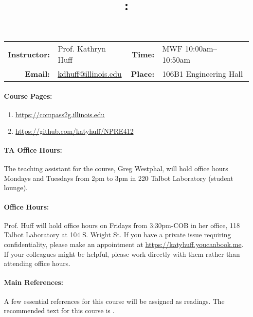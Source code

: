\documentclass[11pt, a4paper]{article}
\title{\CourseNumber: \CourseTitle\\}
\author{\CourseUniversity}
\date{\CourseSemester \CourseYear}
\makeatletter
\newcommand{\CourseNumber}{NPRE412}
\newcommand{\CourseInstructor}{Prof. Kathryn Huff\xspace}%
\newcommand{\CourseDays}{MWF\xspace}%
\newcommand{\CourseStart}{10:00am\xspace}%
\newcommand{\CourseEnd}{10:50am\xspace}%
\newcommand{\CourseInstructorEmail}{kdhuff@illinois.edu}
\newcommand{\CourseRoom}{106B1\xspace}%
\newcommand{\CourseBuilding}{Engineering Hall\xspace}%
\newcommand{\TeachingAssistant}{Greg Westphal\xspace}%
\newcommand{\TAOfficeHourDays}{Mondays and Tuesdays\xspace}%
\newcommand{\TAOfficeHourStart}{2pm\xspace}%
\newcommand{\TAOfficeHourEnd}{3pm\xspace}%
\newcommand{\TAOfficeHourPlace}{220 Talbot Laboratory (student lounge)\xspace}
\makeatother
\begin{document}
\maketitle
\renewcommand{\arraystretch}{1.5}
\begin{center}
\begin{table}[h]
\begin{tabularx}{\textwidth}{rXrX}
\hline
\textbf{Instructor:} & \CourseInstructor & \textbf{Time:} & \CourseDays \CourseStart -- \CourseEnd \\
\textbf{Email:} &  \href{mailto:\CourseInstructorEmail}{\CourseInstructorEmail} & \textbf{Place:} & \CourseRoom \CourseBuilding\\
\hline
\end{tabularx}
\end{table}
\end{center}

\paragraph{Course Pages:}
\begin{enumerate}
        \item \url{https://compass2g.illinois.edu}
        \item \url{https://github.com/katyhuff/\CourseNumber}
\end{enumerate}

\paragraph{TA Office Hours:} The teaching assistant for the course, 
\TeachingAssistant, will hold office hours \TAOfficeHourDays from 
\TAOfficeHourStart to \TAOfficeHourEnd in \TAOfficeHourPlace.

\paragraph{Office Hours:} Prof. Huff will hold office hours on Fridays from 
3:30pm-COB in her office, 118 Talbot Laboratory at 104 S. Wright St. 
If you have a private issue requiring confidentiality, please make an appointment at 
\url{https://katyhuff.youcanbook.me}. If your colleagues might be helpful, 
please work directly with them rather than attending office hours.

\paragraph{Main References:}
A few essential references for this course will be assigned as readings. The 
recommended text for this course is \cite{tsoulfanidis_nuclear_2013}.

\renewcommand{\refname}{\normalfont\selectfont\normalsize}\vspace{-1cm} 

\end{document}
